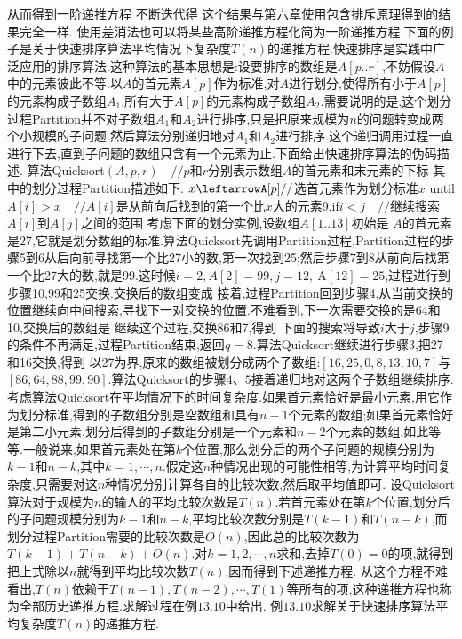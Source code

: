从而得到一阶递推方程
不断迭代得
这个结果与第六章使用包含排斥原理得到的结果完全一样.
使用差消法也可以将某些高阶递推方程化简为一阶递推方程.下面的例子是关于快速排序算法平均情况下复杂度$T(n)$的递推方程.快速排序是实践中广泛应用的排序算法.这种算法的基本思想是:设要排序的数组是$A[p..r]$,不妨假设$A$中的元素彼此不等.以$A$的首元素$A[p]$作为标准,对$A$进行划分,使得所有小于$A[p]$的元素构成子数组$A_{1}$,所有大于$A[p]$的元素构成子数组$A_{2}$.需要说明的是,这个划分过程Partition并不对子数组$A_{1}$和$A_{2}$进行排序,只是把原来规模为$n$的问题转变成两个小规模的子问题.然后算法分别递归地对$A_{1}$和$A_{2}$进行排序.这个递归调用过程一直进行下去,直到子问题的数组只含有一个元素为止.下面给出快速排序算法的伪码描述.
算法Quicksort$(A,p,r)\quad//p$和$r$分别表示数组$A$的首元素和末元素的下标
其中的划分过程Partition描述如下.
$x\leftarrowA[p]//$选首元素作为划分标准$x$
until$A[i]>x\quad//A[i]$是从前向后找到的第一个比$x$大的元素9.if$i<j\quad//$继续搜索$A[i]$到$A[j]$之间的范围
考虑下面的划分实例,设数组$A[1..13]$初始是
$A$的首元素是27,它就是划分数组的标准.算法Quicksort先调用Partition过程,Partition过程的步骤5到6从后向前寻找第一个比27小的数,第一次找到25;然后步骤7到8从前向后找第一个比27大的数,就是99.这时候$i=2,A[2]=99,j=12,\mathrm{~A}[12]=25$,过程进行到步骤10,99和25交换.交换后的数组变成
接着,过程Partition回到步骤4,从当前交换的位置继续向中间搜索,寻找下一对交换的位置.不难看到,下一次需要交换的是64和10,交换后的数组是
继续这个过程,交换86和7,得到
下面的搜索将导致$i$大于$j$,步骤9的条件不再满足,过程Partition结束,返回$q=8$.算法Quicksort继续进行步骤3,把27和16交换,得到
以27为界,原来的数组被划分成两个子数组:$[16,25,0,8,13,10,7]$与$[86,64,88,99,90]$.算法Quicksort的步骤$4、5$接着递归地对这两个子数组继续排序.
考虑算法Quicksort在平均情况下的时间复杂度.如果首元素恰好是最小元素,用它作为划分标准,得到的子数组分别是空数组和具有$n-1$个元素的数组;如果首元素恰好是第二小元素,划分后得到的子数组分别是一个元素和$n-2$个元素的数组,如此等等.一般说来,如果首元素处在第$k$个位置,那么划分后的两个子问题的规模分别为$k-1$和$n-k$,其中$k=1,\cdots,n$.假定这$n$种情况出现的可能性相等,为计算平均时间复杂度,只需要对这$n$种情况分别计算各自的比较次数,然后取平均值即可.
设Quicksort算法对于规模为$n$的输人的平均比较次数是$T(n)$.若首元素处在第$k$个位置,划分后的子问题规模分别为$k-1$和$n-k$,平均比较次数分别是$T(k-1)$和$T(n-k)$,而划分过程Partition需要的比较次数是$O(n)$,因此总的比较次数为$T(k-1)+T(n-k)+O(n)$.对$k=1,2,\cdots,n$求和,去掉$T(0)=0$的项,就得到
把上式除以$n$就得到平均比较次数$T(n)$,因而得到下述递推方程.
从这个方程不难看出,$T(n)$依赖于$T(n-1),T(n-2),\cdots,T(1)$等所有的项,这种递推方程也称为全部历史递推方程.求解过程在例$13.10$中给出.
例$13.10$求解关于快速排序算法平均复杂度$T(n)$的递推方程.
